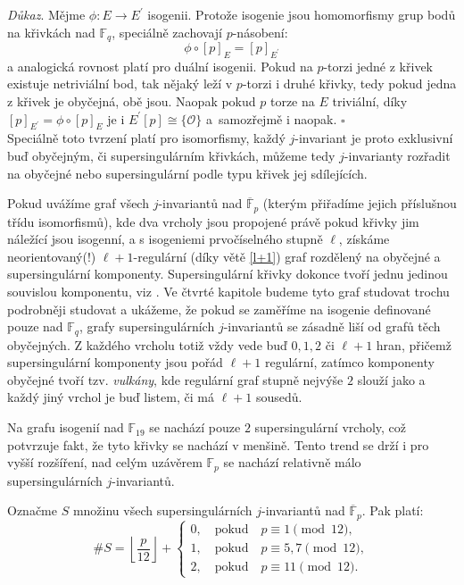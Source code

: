 \documentclass[12pt]{report}
\begin{document}
\noindent \textit{Důkaz}. Mějme $\phi : E \longrightarrow E^\prime$ isogenii. Protože isogenie jsou homomorfismy grup bodů na křivkách nad $\mathbb{F}_q$, speciálně zachovají $p$-násobení:
\begin{equation*}
\phi  \circ[p]_E = [p]_{E^\prime}
\end{equation*}
a analogická rovnost platí pro duální isogenii. Pokud na $p$-torzi jedné z křivek existuje netriviální bod, tak nějaký leží v $p$-torzi i druhé křivky, tedy pokud jedna z křivek je obyčejná, obě jsou. Naopak pokud $p$ torze na $E$ triviální, díky $[p]_{E^\prime} = \phi \circ [p]_E$ je i $E^\prime [p] \cong \lbrace \mathcal{O} \rbrace$ a~samozřejmě i naopak. \hfill $\square$\\

Speciálně toto tvrzení platí pro isomorfismy, každý $j$-invariant je proto exklusivní buď obyčejným, či supersingulárním křivkách, můžeme tedy $j$-invarianty rozřadit na obyčejné nebo supersingulární podle typu křivek jej sdílejících.

Pokud uvážíme graf všech $j$-invariantů nad $\overline{\mathbb{F}}_p$ (kterým přiřadíme jejich příslušnou třídu isomorfismů), kde dva vrcholy jsou propojené právě pokud křivky jim náležící jsou isogenní, a s isogeniemi prvočíselného stupně $\ell$, získáme neorientovaný(!) $\ell+1$-regulární (díky větě \ref{l+1}) graf rozdělený na obyčejné a supersingulární komponenty. Supersingulární křivky dokonce tvoří jednu jedinou souvislou komponentu, viz \cite[Cor. 78]{Kohel}. Ve čtvrté kapitole budeme tyto graf studovat trochu podrobněji studovat a ukážeme, že pokud se zaměříme na isogenie definované pouze nad $\mathbb{F}_q$, grafy supersingulárních $j$-invariantů se zásadně liší od grafů těch obyčejných. Z každého vrcholu totiž vždy vede buď $0,1,2$ či $\ell+1$ hran, přičemž supersingulární komponenty jsou pořád $\ell+1$ regulární, zatímco komponenty obyčejné tvoří tzv. \textit{vulkány}, kde regulární graf stupně nejvýše $2$ slouží jako  a každý jiný vrchol je buď listem, či má $\ell+1$ sousedů.

Na grafu isogenií nad $\mathbb{F}_{19}$ se nachází pouze $2$ supersingulární vrcholy, což potvrzuje fakt, že tyto křivky se nachází v menšině. Tento trend se drží i pro vyšší rozšíření, nad celým uzávěrem $\mathbb{F}_p$ se nachází relativně málo supersingulárních $j$-invariantů.

\begin{veta}
Označme $S$ množinu všech supersingulárních $j$-invariantů nad $\overline{\mathbb{F}}_{p}$. Pak platí:
\begin{equation*}
\# S = \left\lfloor \frac{p}{12} \right\rfloor + \begin{cases}
 0, \quad \text{pokud} \quad p \equiv 1 \pmod{12},\\
 1, \quad \text{pokud} \quad p \equiv 5,7 \pmod{12},\\
 2, \quad \text{pokud} \quad p \equiv 11 \pmod{12}.
 \end{cases}
\end{equation*}
\end{veta}
\end{document}

